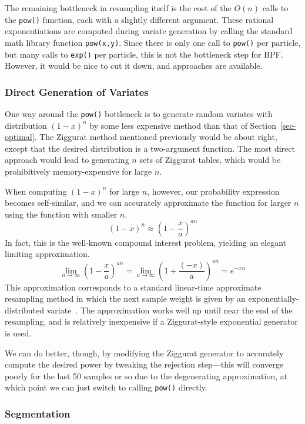 \documentclass[12pt]{article}
\begin{document}
  The remaining bottleneck in resampling itself is the cost
  of the $O(n)$ calls to the {\tt pow()} function, each with
  a slightly different argument.  These rational
  exponentiations are computed during variate generation by
  calling the standard math library function {\tt pow(x,y)}.
  Since there is only one call to {\tt pow()} per particle,
  but many calls to {\tt exp()} per particle, this is not
  the bottleneck step for BPF.  However, it would be nice to
  cut it down, and approaches are available.

\subsubsection{Direct Generation of Variates}

  One way around the {\tt pow()} bottleneck is to generate
  random variates with distribution $(1 - x)^n$ by
  some less expensive method than that of
  Section~\ref{sec-optimal}.  The Ziggurat method mentioned
  previously would be about right, except that the desired
  distribution is a two-argument function.  The most direct
  approach would lead to generating $n$ sets of Ziggurat
  tables, which would be prohibitively memory-expensive for
  large $n$.

  
  When computing $(1 - x)^n$ for large $n$, however, our
  probability expression becomes self-similar, and we can
  accurately approximate the function for larger $n$ using
  the function with smaller $n$. $$
    (1 - x)^n \approx \left(1 - \frac{x}{a}\right)^{an}
  $$
  In fact, this is the well-known compound interest problem,
  yielding an elegant limiting approximation. $$
  \lim_{a \rightarrow \infty}\left(1 - \frac{x}{a}\right)^{an}
  =   \lim_{a \rightarrow \infty}\left(1 + \frac{(-x)}{a}\right)^{an}
  = e^{-xn}$$  This approximation corresponds to a standard 
  linear-time approximate resampling method in which the next sample
  weight is given by an exponentially-distributed
  variate~\cite{carpenter}.  The approximation works well up until near the
  end of the resampling, and is relatively inexpensive if a
  Ziggurat-style exponential generator is used.

  We can do better, though, by modifying the Ziggurat
  generator to accurately compute the desired power by
  tweaking the rejection step---this will converge poorly
  for the last 50 samples or so due to the degenerating
  approximation, at which point we can just switch to
  calling {\tt pow()} directly.

\subsubsection{Segmentation}\label{sec-segment}
\end{document}
